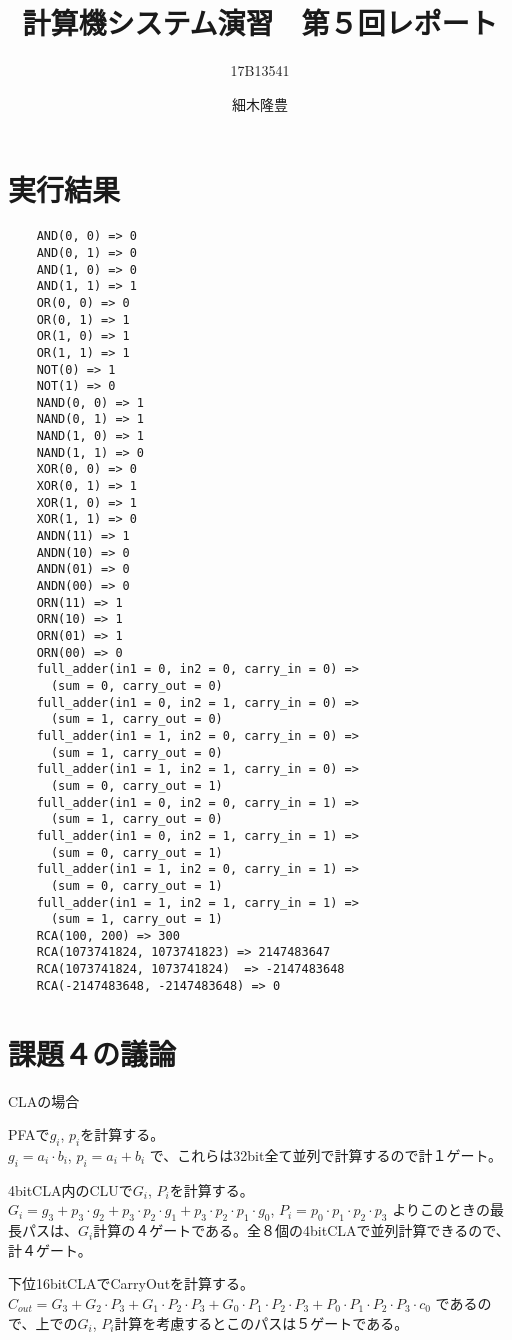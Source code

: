 \documentclass{jarticle}
\title{計算機システム演習　第５回レポート}
\author{17B13541 \and 細木隆豊}
\date{}
\begin{document}
\maketitle
  \section{実行結果}
    \begin{lstlisting}
    AND(0, 0) => 0
    AND(0, 1) => 0
    AND(1, 0) => 0
    AND(1, 1) => 1
    OR(0, 0) => 0
    OR(0, 1) => 1
    OR(1, 0) => 1
    OR(1, 1) => 1
    NOT(0) => 1
    NOT(1) => 0
    NAND(0, 0) => 1
    NAND(0, 1) => 1
    NAND(1, 0) => 1
    NAND(1, 1) => 0
    XOR(0, 0) => 0
    XOR(0, 1) => 1
    XOR(1, 0) => 1
    XOR(1, 1) => 0
    ANDN(11) => 1
    ANDN(10) => 0
    ANDN(01) => 0
    ANDN(00) => 0
    ORN(11) => 1
    ORN(10) => 1
    ORN(01) => 1
    ORN(00) => 0
    full_adder(in1 = 0, in2 = 0, carry_in = 0) =>
      (sum = 0, carry_out = 0)
    full_adder(in1 = 0, in2 = 1, carry_in = 0) =>
      (sum = 1, carry_out = 0)
    full_adder(in1 = 1, in2 = 0, carry_in = 0) =>
      (sum = 1, carry_out = 0)
    full_adder(in1 = 1, in2 = 1, carry_in = 0) =>
      (sum = 0, carry_out = 1)
    full_adder(in1 = 0, in2 = 0, carry_in = 1) =>
      (sum = 1, carry_out = 0)
    full_adder(in1 = 0, in2 = 1, carry_in = 1) =>
      (sum = 0, carry_out = 1)
    full_adder(in1 = 1, in2 = 0, carry_in = 1) =>
      (sum = 0, carry_out = 1)
    full_adder(in1 = 1, in2 = 1, carry_in = 1) =>
      (sum = 1, carry_out = 1)
    RCA(100, 200) => 300
    RCA(1073741824, 1073741823) => 2147483647
    RCA(1073741824, 1073741824)  => -2147483648
    RCA(-2147483648, -2147483648) => 0
    \end{lstlisting}
  \section{課題４の議論}
  {\large CLAの場合}

  PFAで$g_i$, $p_i$を計算する。\\
  $g_i = a_i \cdot b_i$,
  $p_i = a_i + b_i$
  で、これらは32bit全て並列で計算するので計１ゲート。

  4bitCLA内のCLUで$G_i$, $P_i$を計算する。\\
  $G_i = g_3 + p_3 \cdot g_2 + p_3 \cdot p_2 \cdot g_1 + p_3 \cdot p_2 \cdot p_1 \cdot g_0$,
  $P_i = p_0 \cdot p_1 \cdot p_2 \cdot p_3$
  よりこのときの最長パスは、$G_i$計算の４ゲートである。全８個の4bitCLAで並列計算できるので、計４ゲート。

  下位16bitCLAでCarryOutを計算する。\\
  $C_{out} = G_3 + G_2 \cdot P_3 + G_1 \cdot P_2 \cdot P_3 + G_0 \cdot P_1 \cdot P_2 \cdot P_3 + P_0 \cdot P_1 \cdot P_2 \cdot P_3 \cdot c_0$
  であるので、上での$G_i$, $P_i$計算を考慮するとこのパスは５ゲートである。
\end{document}
